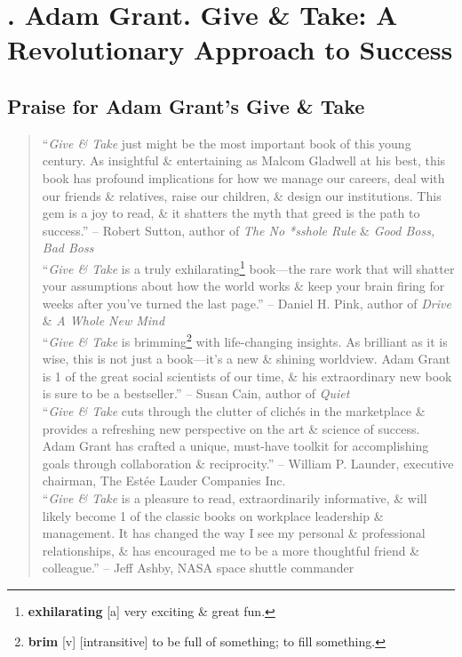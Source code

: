 \documentclass[oneside]{book}
\numberwithin{equation}{section}
\begin{document}

\chapter{\cite{Grant2013, Grant2022}. Adam Grant. Give \& Take: A Revolutionary Approach to Success}

\section*{Praise for Adam Grant's Give \& Take}
\begin{quotation}
	``\textit{Give \& Take} just might be the most important book of this young century. As insightful \& entertaining as Malcom Gladwell at his best, this book has profound implications for how we manage our careers, deal with our friends \& relatives, raise our children, \& design our institutions. This gem is a joy to read, \& it shatters the myth that greed is the path to success.'' -- Robert Sutton, author of \textit{The No *sshole Rule} \& \textit{Good Boss, Bad Boss}\\
	
	``\textit{Give \& Take} is a truly exhilarating\footnote{\textbf{exhilarating} [a] very exciting \& great fun.} book---the rare work that will shatter your assumptions about how the world works \& keep your brain firing for weeks after you've turned the last page.'' -- Daniel H. Pink, author of \textit{Drive} \& \textit{A Whole New Mind}\\
	
	``\textit{Give \& Take} is brimming\footnote{\textbf{brim} [v] [intransitive] to be full of something; to fill something.} with life-changing insights. As brilliant as it is wise, this is not just a book---it's a new \& shining worldview. Adam Grant is 1 of the great social scientists of our time, \& his extraordinary new book is sure to be a bestseller.'' -- Susan Cain, author of \textit{Quiet}\\
	
	``\textit{Give \& Take} cuts through the clutter of clich\'es in the marketplace \& provides a refreshing new perspective on the art \& science of success. Adam Grant has crafted a unique, must-have toolkit for accomplishing goals through collaboration \& reciprocity.'' -- William P. Launder, executive chairman, The Est\'ee Lauder Companies Inc.\\
	
	``\textit{Give \& Take} is a pleasure to read, extraordinarily informative, \& will likely become 1 of the classic books on workplace leadership \& management. It has changed the way I see my personal \& professional relationships, \& has encouraged me to be a more thoughtful friend \& colleague.'' -- Jeff Ashby, NASA space shuttle commander\\
	

\end{quotation}
\end{document}
